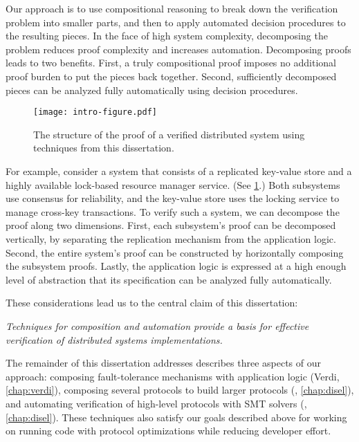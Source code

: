 Our approach is to use compositional reasoning to break down
  the verification problem into smaller parts,
  and then to apply automated decision procedures to the resulting pieces.
In the face of high system complexity,
  decomposing the problem reduces proof complexity and increases automation.
Decomposing proofs leads to two benefits.
First, a truly compositional proof
  imposes no additional proof burden
  to put the pieces back together.
Second, sufficiently decomposed pieces can
  be analyzed fully automatically using decision procedures.

\begin{figure}[t]
  \centering
  \texttt{[image: intro-figure.pdf]}
  \caption{The structure of the proof of a verified distributed system using techniques from this dissertation.}
  \label{fig:intro}
\end{figure}

For example, consider a system that consists of
  a replicated key-value store
  and a highly available lock-based resource manager service.
(See \cref{fig:intro}.)
Both subsystems use consensus for reliability,
  and the key-value store uses the locking service to manage cross-key transactions.
To verify such a system, we can decompose the proof along two dimensions.
First, each subsystem's proof can be decomposed vertically,
  by separating the replication mechanism from the application logic.
Second, the entire system's proof can be constructed
  by horizontally composing the subsystem proofs.
Lastly, the application logic is expressed at a high enough level of abstraction
  that its specification can be analyzed fully automatically.

These considerations lead us to the central claim of this dissertation:
\begin{center}
\emph{Techniques for composition and automation provide a basis for
  effective verification of distributed systems implementations.
}
\end{center}

The remainder of this dissertation addresses describes three aspects of our approach:
  composing fault-tolerance mechanisms with application logic (Verdi, \cref{chap:verdi}),
  composing several protocols to build larger protocols (\disel, \cref{chap:disel}), and
  automating verification of high-level protocols with SMT solvers (\mypyvy, \cref{chap:disel}).
These techniques also satisfy our goals described above for working on
  running code with protocol optimizations while reducing developer effort.

